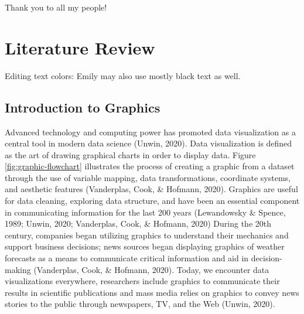 \documentclass[print]{nuthesis}
\begin{document}


\begin{acknowledgments}
Thank you to all my people!
\end{acknowledgments}


\tableofcontents

\listoffigures
\listoftables

\mainmatter


\hypertarget{literature-review}{%
\chapter{Literature Review}\label{literature-review}}

Editing text colors:  Emily may also use mostly black text as well.  

\hypertarget{introduction-to-graphics}{%
\section{Introduction to Graphics}\label{introduction-to-graphics}}

Advanced technology and computing power has promoted data visualization as a central tool in modern data science (Unwin, 2020).
Data visualization is defined as the art of drawing graphical charts in order to display data.
Figure \ref{fig:graphic-flowchart} illustrates the process of creating a graphic from a dataset through the use of variable mapping, data transformations, coordinate systems, and aesthetic features (Vanderplas, Cook, \& Hofmann, 2020).
Graphics are useful for data cleaning, exploring data structure, and have been an essential component in communicating information for the last 200 years (Lewandowsky \& Spence, 1989; Unwin, 2020; Vanderplas, Cook, \& Hofmann, 2020)
During the 20th century, companies began utilizing graphics to understand their mechanics and support business decisions; news sources began displaying graphics of weather forecasts as a means to communicate critical information and aid in decision-making (Vanderplas, Cook, \& Hofmann, 2020).
Today, we encounter data visualizations everywhere, researchers include graphics to communicate their results in scientific publications and mass media relies on graphics to convey news stories to the public through newspapers, TV, and the Web (Unwin, 2020).
\end{document}
